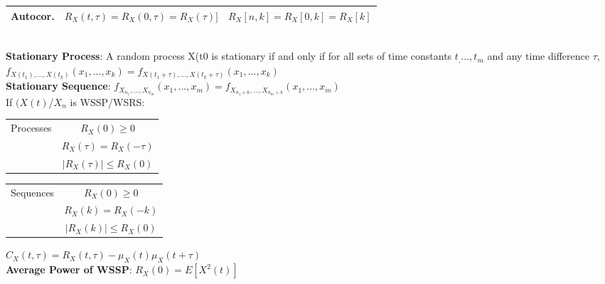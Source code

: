 \documentclass{article}
\begin{document}
\begin{vwcol}[widths={0.63}, sep=.4cm, justify=flush,rule=0pt]
\begin{tabular}{|c|c|c|}
		\hline
		Autocor. & $R_X(t, \tau) = R_X(0, \tau) = R_X(\tau)]$ & $R_X[n, k] = R_X[0, k] = R_X[k]$\\
		\hline
	\end{tabular}\\
	\textbf{Stationary Process}: A random process X(t0 is stationary if and only if for all sets of time constants $t_, ... , t_m$ and any time difference $\tau$,  $f_{X(t_1),... ,  X(t_k)}(x_1, ..., x_k) = f_{X(t_1 +\tau),... ,  X(t_k + \tau)}(x_1, ..., x_k)$
	\\
	\textbf{Stationary Sequence}: $f_{X_{n_1},... ,  X_{n_m}}(x_1, ..., x_m) = f_{X_{n_1 + k},... ,  X_{n_m +k}}(x_1, ..., x_m)$\\
	If $(X(t)$/$X_n$ is WSSP/WSRS:\\
	\begin{tabular}{|c|c|}
		\hline
		Processes & $R_X(0) \geq 0$ \\ & $R_X(\tau) = R_X(-\tau)$ \\ & $\vert R_X(\tau) \vert \leq R_X(0)$ \\
		\hline  
	\end{tabular}
	\begin{tabular}{|c|c|}
		\hline
		Sequences & $R_X(0) \geq 0$ \\ & $R_X(k) = R_X(-k)$ \\ & $\vert R_X(k) \vert \leq R_X(0)$ \\
		\hline  
	\end{tabular}
    \end{vwcol}
	\begin{multicols}{2}
    $C_X(t, \tau) = R_X(t, \tau) -\mu_X(t)\mu_X(t + \tau)$\\
	\textbf{Average Power of WSSP}: $R_X(0) = E[X^2(t)]$
	\end{multicols}
\end{document}
